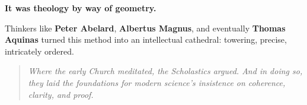 \begin{tcolorbox}[colback=gray!5!white, colframe=black!75!white, title={Historical Sidebar: Scholasticism — The Logic of Faith}]
    \textbf{It was theology by way of geometry.}
    
    Thinkers like \textbf{Peter Abelard}, \textbf{Albertus Magnus}, and eventually \textbf{Thomas Aquinas} turned this method into an intellectual cathedral: towering, precise, intricately ordered.
    
    \begin{quote}
    \textit{Where the early Church meditated, the Scholastics argued. And in doing so, they laid the foundations for modern science’s insistence on coherence, clarity, and proof.}
    \end{quote}
    
    \end{tcolorbox}
    

